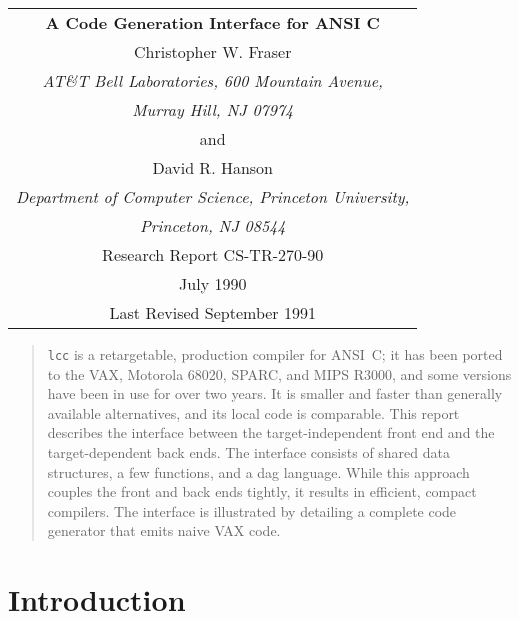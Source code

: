 
\begin{titlepage}
\normalsize
\vspace*{.7in}
\begin{center}
\begin{tabular}{c}
\bf\Large A Code Generation Interface for ANSI C \\[.5in]

Christopher W. Fraser \\
\em AT\&T Bell Laboratories, 600 Mountain Avenue, \\
\em Murray Hill, NJ 07974 \\[1ex]
and \\[1ex]
David R. Hanson \\
\em Department of Computer Science, Princeton University, \\
\em Princeton, NJ 08544 \\[.7in]

Research Report CS-TR-270-90 \\[1ex]
July 1990 \\
Last Revised September 1991 \\[.5in]

\end{tabular}
\end{center}

\begin{abstract}
\normalsize
\verb|lcc| is a retargetable, production compiler for ANSI~C;
it has been ported to the VAX, Motorola 68020, SPARC, and MIPS R3000,
and some versions have been in use for over two years.
It is smaller and faster than generally available alternatives,
and its local code is comparable.
This report describes the interface between the target-independent front end
and the target-dependent back ends.
The interface consists of shared data structures, a few functions,
and a dag language. While this approach couples the front
and back ends tightly, it results in efficient, compact compilers.
The interface is illustrated by detailing a complete code generator
that emits naive VAX code.
\end{abstract}

\end{titlepage}




\section{Introduction}

